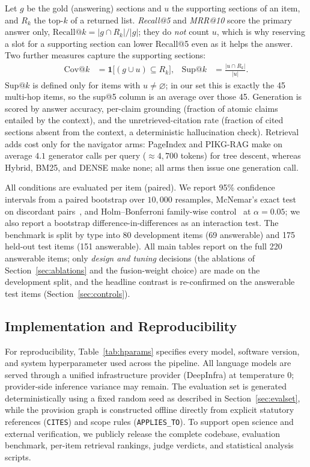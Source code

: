 \documentclass[conference]{IEEEtran}
\begin{document}
Let $g$ be the gold (answering) sections and $u$ the supporting sections of an item, and $R_k$ the
top-$k$ of a returned list. \emph{Recall@5} and \emph{MRR@10} score the primary answer only,
$\mathrm{Recall}@k=|g\cap R_k|/|g|$; they do \emph{not} count $u$, which is why reserving a slot for a
supporting section can lower Recall@5 even as it helps the answer. Two further measures capture the
supporting sections:
\begin{align}
\mathrm{Cov}@k &= \mathbf{1}\big[(g\cup u)\subseteq R_k\big], &
\mathrm{Sup}@k &= \frac{|u\cap R_k|}{|u|}.
\end{align}
$\mathrm{Sup}@k$ is defined only for items with $u\neq\varnothing$; in our set this is exactly the 45
multi-hop items, so the sup@5 column is an average over those 45. Generation is scored by answer
accuracy, per-claim grounding (fraction of atomic claims entailed by the context), and the
unretrieved-citation rate (fraction of cited sections absent from the context, a deterministic
hallucination check). Retrieval adds cost only for the navigator arms: PageIndex and PIKG-RAG make on
average $4.1$ generator calls per query ($\approx4{,}700$ tokens) for tree descent, whereas Hybrid,
BM25, and DENSE make none; all arms then issue one generation call.

All conditions are evaluated per item (paired). We report 95\% confidence intervals from a paired
bootstrap over $10{,}000$ resamples, McNemar's exact test on discordant
pairs~\cite{mcnemar1947}, and Holm--Bonferroni family-wise control~\cite{holm1979simple} at
$\alpha=0.05$; we also report a bootstrap difference-in-differences as an interaction test. The
benchmark is split by type into 80 development items (69 answerable) and 175 held-out test items (151
answerable). All main tables report on the full 220 answerable items; only \emph{design and tuning}
decisions (the ablations of Section~\ref{sec:ablations} and the fusion-weight choice) are made on the
development split, and the headline contrast is re-confirmed on the answerable test items
(Section~\ref{sec:controls}).

\subsection{Implementation and Reproducibility}
\label{sec:repro}

For reproducibility, Table~\ref{tab:hparams} specifies every model, software
version, and system hyperparameter used across the pipeline. All language models are served through
a unified infrastructure provider (DeepInfra) at temperature $0$; provider-side inference variance
may remain. The evaluation set is generated
deterministically using a fixed random seed as described in Section~\ref{sec:evalset}, while the
provision graph is constructed offline directly from explicit statutory references
(\texttt{CITES}) and scope rules (\texttt{APPLIES\_TO}). To support open science and external
verification, we publicly release the complete codebase, evaluation benchmark, per-item retrieval
rankings, judge verdicts, and statistical analysis scripts.
\end{document}
